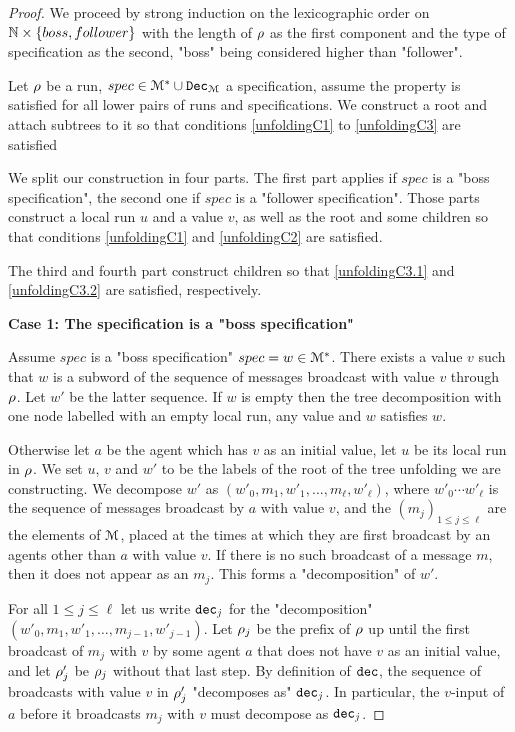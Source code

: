 \ifproofs
\begin{proof}
	
	We proceed by strong induction on the lexicographic order on $\mathbb{N} \times \{boss, follower\}$ with the length of $\rho$ as the first component and the type of specification as the second, "boss" being considered higher than "follower". 
	
	Let $\rho$ be a run, $spec \in \mathcal{M}^* \cup \mathtt{Dec}_{\mathcal{M}}$ a specification, assume the property is satisfied for all lower pairs of runs and specifications. We construct a root and attach subtrees to it so that conditions \ref{unfoldingC1} to \ref{unfoldingC3} are satisfied 
	
	We split our construction in four parts. The first part applies if $spec$ is a "boss specification", the second one if $spec$ is a "follower specification". 
	Those parts construct a local run $u$ and a value $v$, as well as the root and some children so that conditions \ref{unfoldingC1} and \ref{unfoldingC2} are satisfied.
	
	The third and fourth part construct children so that \ref{unfoldingC3.1} and \ref{unfoldingC3.2} are satisfied, respectively.
	
	\textbf{Case 1: The specification is a "boss specification"}
	
	Assume $spec$ is a "boss specification" $spec = w \in \mathcal{M}^*$.
	There exists a value $v$ such that $w$ is a subword of the sequence of messages broadcast with value $v$ through $\rho$. Let $w'$ be the latter sequence.
	If $w$ is empty then the tree decomposition with one node labelled with an empty local run, any value and $w$ satisfies $w$.	
	
	Otherwise let $a$ be the agent which has $v$ as an initial value, let $u$ be its local run in $\rho$. We set $u$, $v$ and $w'$ to be the labels of the root of the tree unfolding we are constructing.
	We decompose $w'$ as $(w'_0, m_1, w'_1, \ldots, m_\ell, w'_\ell)$, where $w'_0\cdots w'_\ell$ is the sequence of messages broadcast by $a$ with value $v$, and the $(m_j)_{1\leq j\leq \ell}$ are the elements of $\mathcal{M}$, placed at the times at which they are first broadcast by an agents other than $a$ with value $v$. If there is no such broadcast of a message $m$, then it does not appear as an $m_j$. This forms a "decomposition" of $w'$.
		
	For all $1 \leq j \leq \ell$ let us write $\mathtt{dec}_j$ for the "decomposition" $(w'_0, m_1, w'_1, \ldots, m_{j-1}, w'_{j-1})$. Let $\rho_j$ be the prefix of $\rho$ up until the first broadcast of $m_j$ with $v$ by some agent $a$ that does not have $v$ as an initial value, and let $\rho'_j$ be $\rho_j$ without that last step. By definition of $\mathtt{dec}$, the sequence of broadcasts with value $v$ in $\rho'_j$ "decomposes as" $\mathtt{dec}_j$.
	In particular, the $v$-input of $a$ before it broadcasts $m_j$ with $v$ must decompose as $\mathtt{dec}_j$.
	 

\end{proof}
